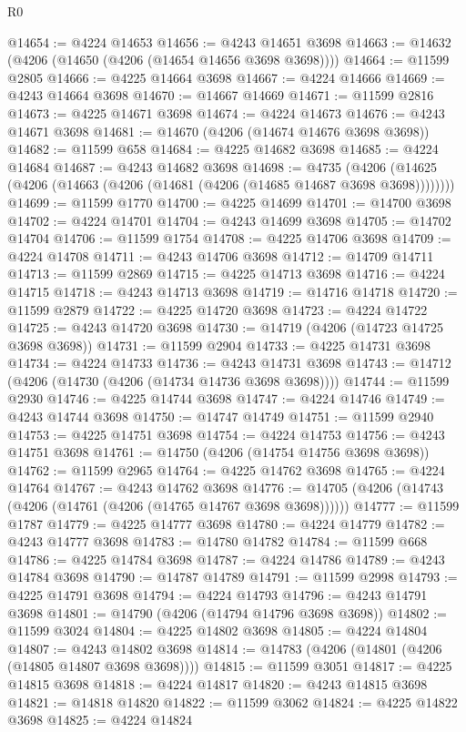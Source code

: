 \begin{lexlean}{R0}
\begin{coremodule}
@14654 := @4224 @14653
@14656 := @4243 @14651 @3698
@14663 := @14632 (@4206 (@14650 (@4206 (@14654 @14656 @3698 @3698))))
@14664 := @11599 @2805
@14666 := @4225 @14664 @3698
@14667 := @4224 @14666
@14669 := @4243 @14664 @3698
@14670 := @14667 @14669
@14671 := @11599 @2816
@14673 := @4225 @14671 @3698
@14674 := @4224 @14673
@14676 := @4243 @14671 @3698
@14681 := @14670 (@4206 (@14674 @14676 @3698 @3698))
@14682 := @11599 @658
@14684 := @4225 @14682 @3698
@14685 := @4224 @14684
@14687 := @4243 @14682 @3698
@14698 := @4735
    (@4206 (@14625 (@4206 (@14663 (@4206 (@14681 (@4206 (@14685 @14687 @3698 @3698))))))))
@14699 := @11599 @1770
@14700 := @4225 @14699
@14701 := @14700 @3698
@14702 := @4224 @14701
@14704 := @4243 @14699 @3698
@14705 := @14702 @14704
@14706 := @11599 @1754
@14708 := @4225 @14706 @3698
@14709 := @4224 @14708
@14711 := @4243 @14706 @3698
@14712 := @14709 @14711
@14713 := @11599 @2869
@14715 := @4225 @14713 @3698
@14716 := @4224 @14715
@14718 := @4243 @14713 @3698
@14719 := @14716 @14718
@14720 := @11599 @2879
@14722 := @4225 @14720 @3698
@14723 := @4224 @14722
@14725 := @4243 @14720 @3698
@14730 := @14719 (@4206 (@14723 @14725 @3698 @3698))
@14731 := @11599 @2904
@14733 := @4225 @14731 @3698
@14734 := @4224 @14733
@14736 := @4243 @14731 @3698
@14743 := @14712 (@4206 (@14730 (@4206 (@14734 @14736 @3698 @3698))))
@14744 := @11599 @2930
@14746 := @4225 @14744 @3698
@14747 := @4224 @14746
@14749 := @4243 @14744 @3698
@14750 := @14747 @14749
@14751 := @11599 @2940
@14753 := @4225 @14751 @3698
@14754 := @4224 @14753
@14756 := @4243 @14751 @3698
@14761 := @14750 (@4206 (@14754 @14756 @3698 @3698))
@14762 := @11599 @2965
@14764 := @4225 @14762 @3698
@14765 := @4224 @14764
@14767 := @4243 @14762 @3698
@14776 := @14705 (@4206 (@14743 (@4206 (@14761 (@4206 (@14765 @14767 @3698 @3698))))))
@14777 := @11599 @1787
@14779 := @4225 @14777 @3698
@14780 := @4224 @14779
@14782 := @4243 @14777 @3698
@14783 := @14780 @14782
@14784 := @11599 @668
@14786 := @4225 @14784 @3698
@14787 := @4224 @14786
@14789 := @4243 @14784 @3698
@14790 := @14787 @14789
@14791 := @11599 @2998
@14793 := @4225 @14791 @3698
@14794 := @4224 @14793
@14796 := @4243 @14791 @3698
@14801 := @14790 (@4206 (@14794 @14796 @3698 @3698))
@14802 := @11599 @3024
@14804 := @4225 @14802 @3698
@14805 := @4224 @14804
@14807 := @4243 @14802 @3698
@14814 := @14783 (@4206 (@14801 (@4206 (@14805 @14807 @3698 @3698))))
@14815 := @11599 @3051
@14817 := @4225 @14815 @3698
@14818 := @4224 @14817
@14820 := @4243 @14815 @3698
@14821 := @14818 @14820
@14822 := @11599 @3062
@14824 := @4225 @14822 @3698
@14825 := @4224 @14824

\end{coremodule}
\end{lexlean}
